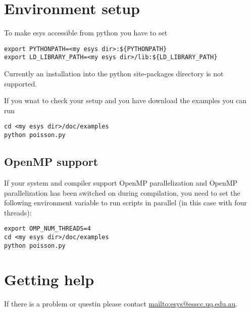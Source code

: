 \section{Environment setup}
To make esys accessible from python you have to set
\begin{verbatim}
export PYTHONPATH=<my esys dir>:${PYTHONPATH}
export LD_LIBRARY_PATH=<my esys dir>/lib:${LD_LIBRARY_PATH}
\end{verbatim}
Currently an installation into the python site-packages directory is not supported.

If you wnat to check your setup and you have download the examples you can run
\begin{verbatim}
cd <my esys dir>/doc/examples
python poisson.py
\end{verbatim}

\subsection{OpenMP support}

If your system and compiler support OpenMP parallelization and OpenMP parallelization has been switched on during compilation, you need to set the following environment variable to run scripts in parallel (in this case with four threads):
\begin{verbatim}
export OMP_NUM_THREADS=4
cd <my esys dir>/doc/examples
python poisson.py
\end{verbatim}

\section{Getting help}
If there is a problem or questin please contact \url{mailto:esys@esscc.uq.edu.au}.
